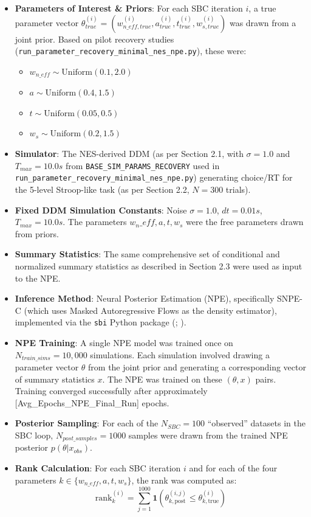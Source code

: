 \documentclass[
  11pt,
]{article}
\providecommand{\tightlist}{%
  \setlength{\itemsep}{0pt}\setlength{\parskip}{0pt}}
\begin{document}
\begin{itemize}
\tightlist
\item
  \textbf{Parameters of Interest \& Priors}: For each SBC iteration
  \(i\), a true parameter vector
  \(\theta_{true}^{(i)} = (w_{n\_eff,true}^{(i)}, a_{true}^{(i)}, t_{true}^{(i)}, w_{s,true}^{(i)})\)
  was drawn from a joint prior. Based on pilot recovery studies
  (\texttt{run\_parameter\_recovery\_minimal\_nes\_npe.py}), these were:

  \begin{itemize}
  \tightlist
  \item
    \(w_{n\_eff} \sim \mathrm{Uniform}(0.1, 2.0)\)
  \item
    \(a \sim \mathrm{Uniform}(0.4, 1.5)\)
  \item
    \(t \sim \mathrm{Uniform}(0.05, 0.5)\)
  \item
    \(w_s \sim \mathrm{Uniform}(0.2, 1.5)\)
  \end{itemize}
\item
  \textbf{Simulator}: The NES-derived DDM (as per Section 2.1, with
  \(\sigma=1.0\) and \(T_{max}=10.0s\) from
  \texttt{BASE\_SIM\_PARAMS\_RECOVERY} used in
  \texttt{run\_parameter\_recovery\_minimal\_nes\_npe.py}) generating
  choice/RT for the 5-level Stroop-like task (as per Section 2.2,
  \(N=300\) trials).
\item
  \textbf{Fixed DDM Simulation Constants}: Noise \(\sigma=1.0\),
  \(dt=0.01s\), \(T_{max}=10.0s\). The parameters
  \(w_n\_eff, a, t, w_s\) were the free parameters drawn from priors.
\item
  \textbf{Summary Statistics}: The same comprehensive set of conditional
  and normalized summary statistics as described in Section 2.3 were
  used as input to the NPE.
\item
  \textbf{Inference Method}: Neural Posterior Estimation (NPE),
  specifically SNPE-C (which uses Masked Autoregressive Flows as the
  density estimator), implemented via the \texttt{sbi} Python package
  (;
  ).
\item
  \textbf{NPE Training}: A single NPE model was trained once on
  \(N_{train\_sims} = 10,000\) simulations. Each simulation involved
  drawing a parameter vector \(\theta\) from the joint prior and
  generating a corresponding vector of summary statistics \(x\). The NPE
  was trained on these \((\theta, x)\) pairs. Training converged
  successfully after approximately {[}Avg\_Epochs\_NPE\_Final\_Run{]}
  epochs.
\item
  \textbf{Posterior Sampling}: For each of the \(N_{SBC}=100\)
  ``observed'' datasets in the SBC loop, \(N_{post\_samples}=1000\)
  samples were drawn from the trained NPE posterior
  \(p(\theta|x_{obs})\).
\item
  \textbf{Rank Calculation}: For each SBC iteration \(i\) and for each
  of the four parameters \(k \in \{w_{n\_eff}, a, t, w_s\}\), the rank
  was computed as: \[
  \mathrm{rank}^{(i)}_k = \sum_{j=1}^{1000} \mathbf{1}\left(\theta_{k,\mathrm{post}}^{(i,j)} \leq \theta_{k,\mathrm{true}}^{(i)}\right)
  \]
\end{itemize}
\end{document}
